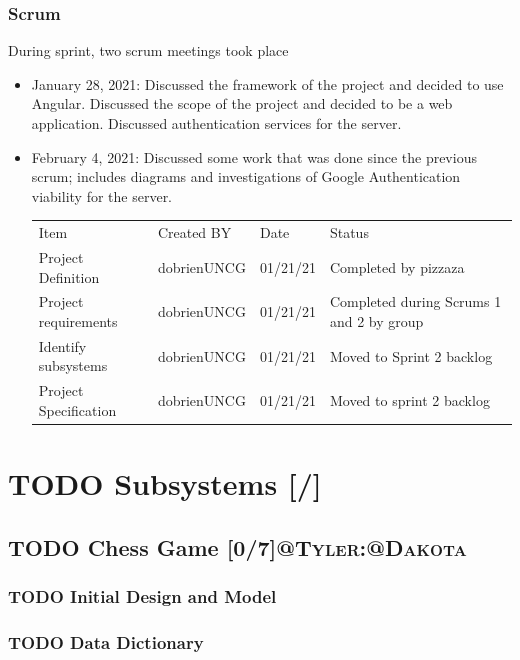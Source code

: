 \documentclass[11pt]{article}
\begin{document}
\subsubsection{Scrum}
\label{sec:orgcb9bd18}
During sprint, two scrum meetings took place
\begin{itemize}
\item January 28, 2021: Discussed the framework of the project and
decided to use Angular. Discussed the scope of the project and
decided to be a web application. Discussed authentication
services for the server.
\item February 4, 2021: Discussed some work that was done since the
previous scrum; includes diagrams and investigations of Google
Authentication viability for the server.

\begin{center}
\begin{tabular}{llll}
Item & Created BY & Date & Status\\
Project Definition & dobrienUNCG & 01/21/21 & Completed by pizzaza\\
Project requirements & dobrienUNCG & 01/21/21 & Completed during Scrums 1 and 2 by group\\
Identify subsystems & dobrienUNCG & 01/21/21 & Moved to Sprint 2 backlog\\
Project Specification & dobrienUNCG & 01/21/21 & Moved to sprint 2 backlog\\
\end{tabular}
\end{center}
\end{itemize}

\section{{\bfseries\sffamily TODO} Subsystems [/]}
\label{sec:orgeeeb2a7}
\subsection{{\bfseries\sffamily TODO} Chess Game [0/7]\hfill{}\textsc{@Tyler:@Dakota}}
\label{sec:orgaed6d01}
\subsubsection{{\bfseries\sffamily TODO} Initial Design and Model}
\label{sec:org559f0ac}
\subsubsection{{\bfseries\sffamily TODO} Data Dictionary}
\label{sec:org249389a}
\end{document}
